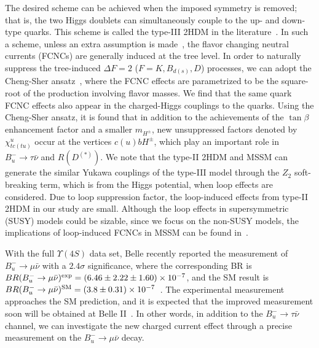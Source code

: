 \documentclass[prd,preprint,superscriptaddress,amsmath,amssymb]{revtex4}
\begin{document}
The desired scheme can be achieved when the imposed  symmetry  is removed; that is, the two Higgs doublets can simultaneously couple to the up- and down-type quarks. This  scheme is called the type-III 2HDM in the literature~\cite{Benbrik:2015evd,Crivellin:2012ye,HernandezSanchez:2012eg}. In such a scheme, unless an extra assumption is made~\cite{Ahn:2010zza}, the flavor changing neutral currents  (FCNCs) are generally induced at the tree level. In order to  naturally suppress the tree-induced $\Delta F=2$ ($F=K,B_{d(s)},D$) processes, we can adopt the Cheng-Sher ansatz~\cite{Cheng:1987rs}, where the FCNC effects are parametrized to be the square-root of the production involving flavor masses.  We find that the same quark FCNC effects  also appear in the charged-Higgs couplings to the quarks. Using the Cheng-Sher ansatz,   it is found that in addition to the achievements of the $\tan\beta$ enhancement factor and a smaller $m_{H^\pm}$,  new unsuppressed factors denoted by $\chi^u_{tc(tu)}$ occur at the vertices $c(u)bH^\pm$, which play an important role in  $B^-_u \to \tau \bar\nu$ and $R(D^{(*)})$. We note that the type-II 2HDM and MSSM can generate the similar Yukawa couplings of the type-III model through the $Z_2$ soft-breaking term, which is from the Higgs potential, when loop effects are considered. Due to loop suppression factor, the loop-induced effects from type-II 2HDM in our study are small. Although the loop effects in supersymmetric (SUSY) models could be sizable, since we focus on the non-SUSY  models, the implications of loop-induced FCNCs in MSSM can be found in~\cite{Babu:1999hn,Isidori:2001fv,Isidori:2002qe,Dedes:2002rh}. 
 
 With the full $\Upsilon(4S)$ data set,  Belle recently reported the measurement of $B^-_u \to \mu \bar\nu$ with a $2.4\sigma$ significance, where the corresponding BR is $BR(B^-_u \to \mu \bar \nu)^{\rm exp} = (6.46 \pm 2.22 \pm 1.60)\times 10^{-7}$, and the SM result is $BR(B^-_u \to \mu \bar \nu)^{\rm SM} = (3.8 \pm 0.31)\times 10^{-7}$~\cite{Sibidanov:2017vph}.  
  The experimental measurement approaches the SM prediction, and it is expected that the improved measurement soon will be obtained at Belle II~\cite{Abe:2010gxa}.  In other words, in addition to the $B^-_u \to \tau \bar \nu$ channel, we can investigate the new charged current effect through a  precise measurement on the $B^-_u \to \mu \bar\nu$ decay. 
 
\end{document}
